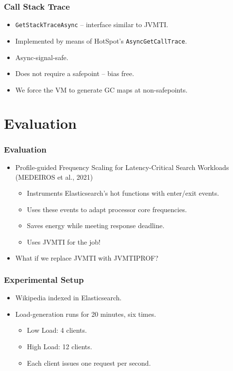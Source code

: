\documentclass{beamer}
\begin{document}
\begin{frame}
\frametitle{Call Stack Trace}
\begin{itemize}
\item \lstinline{GetStackTraceAsync} -- interface similar to JVMTI.
\item Implemented by means of HotSpot's \lstinline{AsyncGetCallTrace}.
\item Async-signal-safe.
\item Does not require a safepoint -- bias free.
\item We force the VM to generate GC maps at non-safepoints.
\end{itemize}
\end{frame}

\section{Evaluation}

\begin{frame}
\frametitle{Evaluation}
\begin{itemize}
\item Profile-guided Frequency Scaling for Latency-Critical Search Workloads (MEDEIROS et al., 2021)
\begin{itemize}
\item Instruments Elasticsearch's hot functions with enter/exit events.
\item Uses these events to adapt processor core frequencies.
\item Saves energy while meeting response deadline. %
\item Uses JVMTI for the job!
\end{itemize}
\item What if we replace JVMTI with JVMTIPROF?
\end{itemize}
\end{frame}

\begin{frame}
\frametitle{Experimental Setup}
\begin{itemize}
\item Wikipedia indexed in Elasticsearch.
\item Load-generation runs for 20 minutes, six times.
\begin{itemize}
\item Low Load: 4 clients.
\item High Load: 12 clients.
\item Each client issues one request per second.
\end{itemize}
\end{itemize}
\end{frame}
\end{document}
